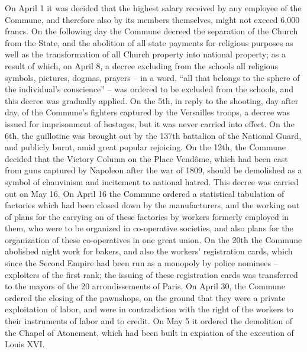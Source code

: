 \documentclass{article}
\begin{document}
On April 1 it was decided that the highest salary received by any employee
of the Commune, and therefore also by its members themselves, might not
exceed 6,000 francs. On the following day the Commune decreed the
separation of the Church from the State, and the abolition of all state
payments for religious purposes as well as the transformation of all
Church property into national property; as a result of which, on April 8,
a decree excluding from the schools all religious symbols, pictures,
dogmas, prayers – in a word, “all that belongs to the sphere of the
individual’s conscience” – was ordered to be excluded from the schools,
and this decree was gradually applied. On the 5th, in reply to the
shooting, day after day, of the Commune’s fighters captured by the
Versailles troops, a decree was issued for imprisonment of hostages, but
it was never carried into effect. On the 6th, the guillotine was brought
out by the 137th battalion of the National Guard, and publicly burnt, amid
great popular rejoicing. On the 12th, the Commune decided that the Victory
Column on the Place Vendôme, which had been cast from guns captured by
Napoleon after the war of 1809, should be demolished as a symbol of
chauvinism and incitement to national hatred. This decree was carried out
on May 16. On April 16 the Commune ordered a statistical tabulation of
factories which had been closed down by the manufacturers, and the working
out of plans for the carrying on of these factories by workers formerly
employed in them, who were to be organized in co-operative societies, and
also plans for the organization of these co-operatives in one great union.
On the 20th the Commune abolished night work for bakers, and also the
workers’ registration cards, which since the Second Empire had been run as
a monopoly by police nominees – exploiters of the first rank; the issuing
of these registration cards was transferred to the mayors of the 20
arrondissements of Paris. On April 30, the Commune ordered the closing of
the pawnshops, on the ground that they were a private exploitation of
labor, and were in contradiction with the right of the workers to their
instruments of labor and to credit. On May 5 it ordered the demolition of
the Chapel of Atonement, which had been built in expiation of the
execution of Louis XVI.
\end{document}

